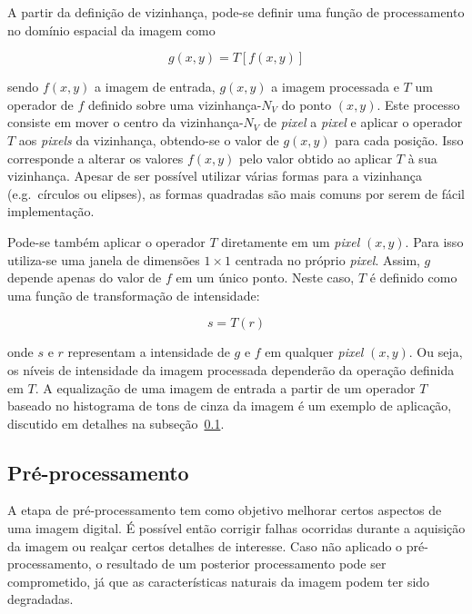 A partir da definição de vizinhança, pode-se definir uma função de
processamento no domínio espacial da imagem como

\begin{equation}
  g(x,y) = T[f(x,y)]
  \label{eq:fproc}
\end{equation}

\noindent sendo $f(x,y)$ a imagem de entrada, $g(x,y)$ a imagem
processada e $T$ um operador de $f$ definido sobre uma
vizinhança-$N_V$ do ponto $(x,y)$. Este processo consiste em mover o
centro da vizinhança-$N_V$ de \textit{pixel} a \textit{pixel} e aplicar o operador $T$
aos \textit{pixels} da vizinhança, obtendo-se o valor de $g(x,y)$ para cada
posição. Isso corresponde a alterar os valores $f(x,y)$ pelo valor
obtido ao aplicar $T$ à sua vizinhança. Apesar de ser possível
utilizar várias formas para a vizinhança (e.g.\ círculos ou elipses),
as formas quadradas são mais comuns por serem de fácil
implementação.~\cite{gonzalez}

Pode-se também aplicar o operador $T$ diretamente em um \textit{pixel}
$(x,y)$. Para isso utiliza-se uma janela de dimensões $1 \times 1$
centrada no próprio \textit{pixel}. Assim, $g$ depende apenas do valor de $f$
em um único ponto. Neste caso, $T$ é definido como uma função de
transformação de intensidade:

\begin{equation}
  s = T(r)
\end{equation} 

\noindent onde $s$ e $r$ representam a intensidade de $g$ e $f$ em qualquer \textit{pixel} $(x,y)$. 
Ou seja, os níveis de intensidade da imagem processada dependerão da
operação definida em $T$. A equalização de uma imagem de entrada a
partir de um operador $T$ baseado no histograma de tons de cinza da
imagem é um exemplo de aplicação, discutido em detalhes na
subseção~\ref{sec:preproc}.

\subsection{Pré-processamento}
\label{sec:preproc}

A etapa de pré-processamento tem como objetivo melhorar certos
aspectos de uma imagem digital. É possível então corrigir falhas
ocorridas durante a aquisição da imagem ou realçar certos detalhes de
interesse. Caso não aplicado o pré-processamento, o resultado de um
posterior processamento pode ser comprometido, já que as
características naturais da imagem podem ter sido
degradadas.~\cite{luciano,gonzalez}

